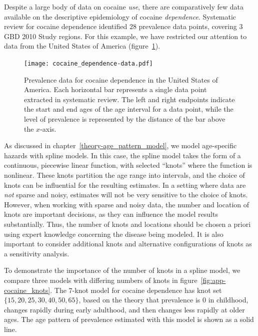 Despite a large body of data on cocaine \emph{use}, there are comparatively few
data available on the descriptive epidemiology of cocaine
\emph{dependence}.\cite{degenhardt_what_2011} Systematic review for cocaine
dependence identified $28$ prevalence data points,
covering $3$ GBD 2010 Study regions.  For this example, we have restricted our attention
to data from the United States of America (figure~\ref{fig:app-cocaine_data}).

    \begin{figure}[h]
        \begin{center}
            \texttt{[image: cocaine\_dependence-data.pdf]}
            \caption{Prevalence data for cocaine dependence in the
              United States of America. Each horizontal bar represents
              a single data point extracted in systematic review.  The
              left and right endpoints indicate the start and end ages
              of the age interval for a data point, while the level of
              prevalence is represented by the distance of the bar
              above the $x$-axis.}
            \label{fig:app-cocaine_data}
        \end{center}
    \end{figure}

As discussed in chapter~\ref{theory-age_pattern_model}, we model
age-specific hazards with spline models.  In this
case, the spline model takes the form of a continuous, piecewise
linear function, with selected ``knots'' where the function is nonlinear.
These knots partition the age range
into intervals, and the choice of knots can be influential for the
resulting estimates.  In a setting where data are \emph{not} sparse and
noisy, estimates will not be very sensitive to the choice of knots.
However, when working with sparse and noisy data, the number and
location of knots are important decisions, as they can influence the
model results substantially.  Thus, the number of knots and locations
should be chosen a priori using expert knowledge concerning the
disease being modeled.  It is also
important to consider additional knots and alternative configurations
of knots as a sensitivity analysis.

To demonstrate the importance of the number of knots in a spline
model, we compare three models with differing numbers of knots in
figure~\ref{fig:app-cocaine_knots}.  The $7$-knot model for cocaine
dependence has knot set $\{15, 20, 25, 30, 40, 50, 65\}$, based on the theory that prevalence is $0$ in childhood,
changes rapidly during early adulthood, and then changes less rapidly
at older ages.  The age pattern of prevalence estimated with this
model is shown as a solid line.

